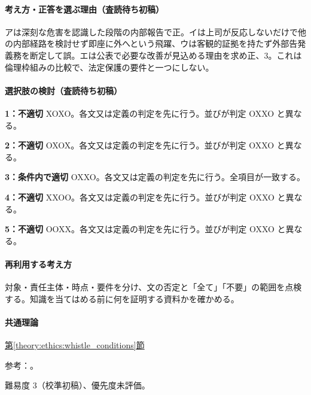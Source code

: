 \paragraph{考え方・正答を選ぶ理由（査読待ち初稿）} アは深刻な危害を認識した段階の内部報告で正。イは上司が反応しないだけで他の内部経路を検討せず即座に外へという飛躍、ウは客観的証拠を持たず外部告発義務を断定して誤。エは公表で必要な改善が見込める理由を求め正、3。これは倫理枠組みの比較で、法定保護の要件と一つにしない。

\paragraph{選択肢の検討（査読待ち初稿）}\mbox{}\par

\noindent\textbf{1：不適切} XOXO。各文又は定義の判定を先に行う。並びが判定 OXXO と異なる。\par

\noindent\textbf{2：不適切} OXOX。各文又は定義の判定を先に行う。並びが判定 OXXO と異なる。\par

\noindent\textbf{3：条件内で適切} OXXO。各文又は定義の判定を先に行う。全項目が一致する。\par

\noindent\textbf{4：不適切} XXOO。各文又は定義の判定を先に行う。並びが判定 OXXO と異なる。\par

\noindent\textbf{5：不適切} OOXX。各文又は定義の判定を先に行う。並びが判定 OXXO と異なる。\par

\paragraph{再利用する考え方} 対象・責任主体・時点・要件を分け、文の否定と「全て」「不要」の範囲を点検する。知識を当てはめる前に何を証明する資料かを確かめる。

\paragraph{共通理論} \hyperref[theory:ethics:whistle_conditions]{第\ref*{theory:ethics:whistle_conditions}節}

\par 参考：\cite{muroran_ethics_cases}。

\par 難易度 3（校準初稿）、優先度未評価。

